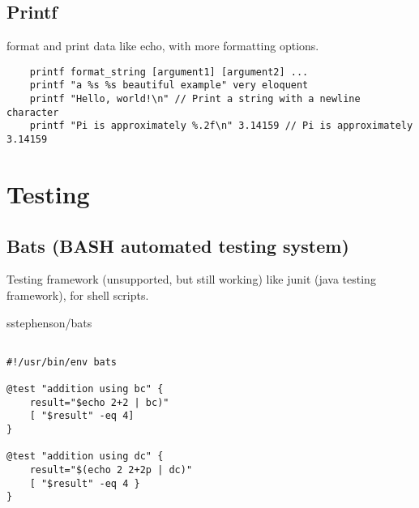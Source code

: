 \subsection{Printf}

    format and print data like echo, with more formatting options.

\begin{verbatim}
    printf format_string [argument1] [argument2] ...
    printf "a %s %s beautiful example" very eloquent
    printf "Hello, world!\n" // Print a string with a newline character
    printf "Pi is approximately %.2f\n" 3.14159 // Pi is approximately 3.14159
\end{verbatim}

\section{Testing}
\subsection{Bats (BASH automated testing system)}

    Testing framework (unsupported, but still working) 
    like junit (java testing framework), for shell scripts. 

sstephenson/bats

\begin{verbatim}

#!/usr/bin/env bats

@test "addition using bc" {
    result="$echo 2+2 | bc)"
    [ "$result" -eq 4]
}

@test "addition using dc" {
    result="$(echo 2 2+2p | dc)"
    [ "$result" -eq 4 }
}
\end{verbatim}

